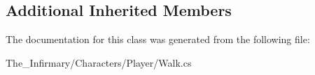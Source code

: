 \subsection*{Additional Inherited Members}


The documentation for this class was generated from the following file\+:\begin{DoxyCompactItemize}
\item 
The\+\_\+\+Infirmary/\+Characters/\+Player/Walk.\+cs\end{DoxyCompactItemize}
